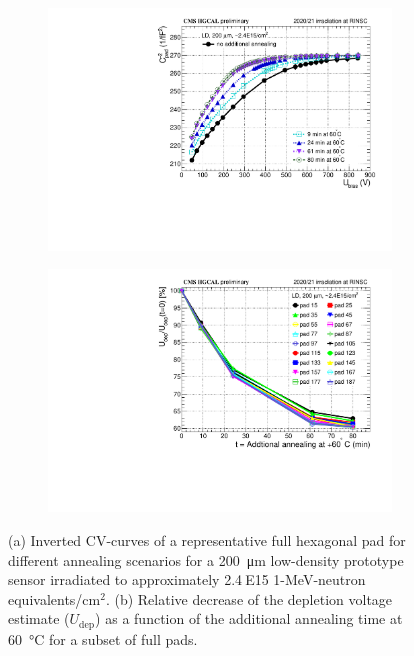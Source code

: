 \begin{figure}
	\captionsetup[subfigure]{aboveskip=-1pt,belowskip=-1pt}
	\centering

	\begin{subfigure}[b]{0.49\textwidth}
		\includegraphics[width=0.999\textwidth]{plots/annealing_Vdep/annealing_CV_ch24.pdf}
		\subcaption{
		}
        \label{plot:annealing_CV}
	\end{subfigure}
    \hfill
    \begin{subfigure}[b]{0.49\textwidth}
		\includegraphics[width=0.999\textwidth]{plots/annealing_Vdep/annealing_Vdep.pdf}
		\subcaption{
		}		
        \label{plot:annealing_Vdep}
	\end{subfigure}
	\caption{
        (a) Inverted CV-curves of a representative full hexagonal pad for different annealing scenarios for a \SI{200}{\micro\metre} low-density prototype sensor irradiated to approximately 2.4$~$E15 1-MeV-neutron equivalents/cm$^{2}$.   
		(b) Relative decrease of the depletion voltage estimate ($U_\text{dep}$) as a function of the additional annealing time at \SI{60}{\celsius} for a subset of full pads.
	}
\end{figure}
